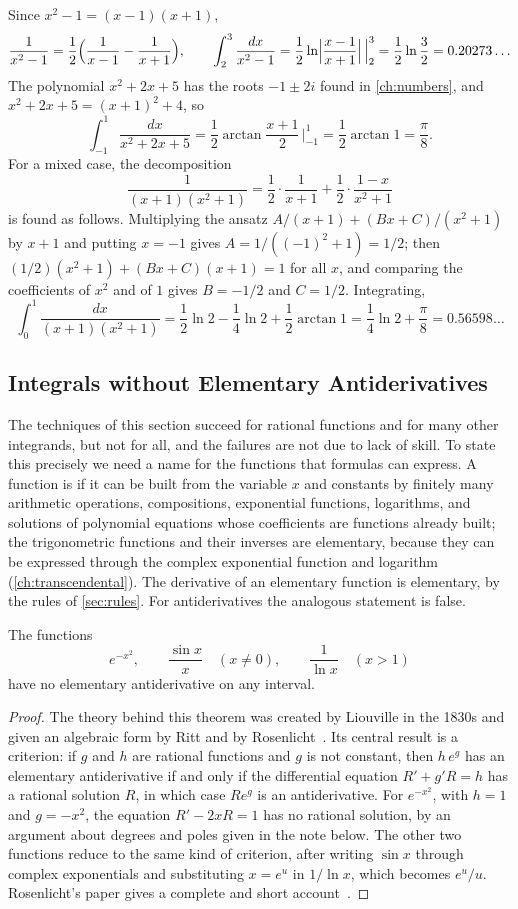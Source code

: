 Since $x^2-1=(x-1)(x+1)$,
\[
\frac1{x^2-1}=\frac12\Bigl(\frac1{x-1}-\frac1{x+1}\Bigr),\qquad\int_2^3\frac{dx}{x^2-1}=\frac12\ln\Bigl|\frac{x-1}{x+1}\Bigr|\,\Big|_2^3=\frac12\ln\frac32=0.20273\ldots
\]
The polynomial $x^2+2x+5$ has the roots $-1\pm2i$ found in \cref{ch:numbers}, and $x^2+2x+5=(x+1)^2+4$, so
\[
\int_{-1}^1\frac{dx}{x^2+2x+5}=\frac12\arctan\frac{x+1}2\,\Big|_{-1}^1=\frac12\arctan1=\frac\pi8 .
\]
For a mixed case, the decomposition
\[
\frac1{(x+1)(x^2+1)}=\frac12\cdot\frac1{x+1}+\frac12\cdot\frac{1-x}{x^2+1}
\]
is found as follows. Multiplying the ansatz $A/(x+1)+(Bx+C)/(x^2+1)$ by $x+1$ and putting $x=-1$ gives $A=1/((-1)^2+1)=1/2$; then $(1/2)(x^2+1)+(Bx+C)(x+1)=1$ for all $x$, and comparing the coefficients of $x^2$ and of $1$ gives $B=-1/2$ and $C=1/2$. Integrating,
\[
\int_0^1\frac{dx}{(x+1)(x^2+1)}=\frac12\ln2-\frac14\ln2+\frac12\arctan1=\frac14\ln2+\frac\pi8=0.56598\ldots
\]

\subsection{Integrals without Elementary Antiderivatives}

The techniques of this section succeed for rational functions and for many other integrands, but not for all, and the failures are not due to lack of skill. To state this precisely we need a name for the functions that formulas can express. A function is  if it can be built from the variable $x$ and constants by finitely many arithmetic operations, compositions, exponential functions, logarithms, and solutions of polynomial equations whose coefficients are functions already built; the trigonometric functions and their inverses are elementary, because they can be expressed through the complex exponential function and logarithm (\cref{ch:transcendental}). The derivative of an elementary function is elementary, by the rules of \cref{sec:rules}. For antiderivatives the analogous statement is false.

\begin{theorem}[Liouville]
\label{thm:liouville}
The functions
\[
e^{-x^2},\qquad\frac{\sin x}x\quad(x\ne0),\qquad\frac1{\ln x}\quad(x>1)
\]
have no elementary antiderivative on any interval.
\end{theorem}

\begin{proof}
The theory behind this theorem was created by Liouville in the 1830s and given an algebraic form by Ritt and by Rosenlicht~\cite{ritt1948,rosenlicht1972}. Its central result is a criterion: if $g$ and $h$ are rational functions and $g$ is not constant, then $h\,e^g$ has an elementary antiderivative if and only if the differential equation $R'+g'R=h$ has a rational solution $R$, in which case $Re^g$ is an antiderivative. For $e^{-x^2}$, with $h=1$ and $g=-x^2$, the equation $R'-2xR=1$ has no rational solution, by an argument about degrees and poles given in the note below. The other two functions reduce to the same kind of criterion, after writing $\sin x$ through complex exponentials and substituting $x=e^u$ in $1/\ln x$, which becomes $e^u/u$. Rosenlicht's paper gives a complete and short account~\cite{rosenlicht1972}.
\end{proof}


